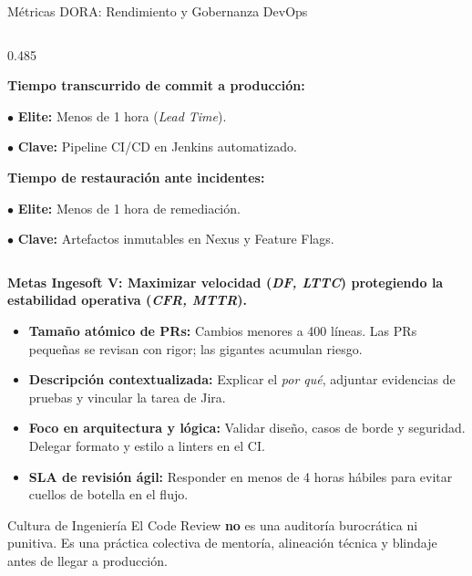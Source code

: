 \documentclass[aspectratio=169]{beamer}
\begin{document}
\begin{frame}{Métricas DORA: Rendimiento y Gobernanza DevOps}
\begin{columns}[T,onlytextwidth]
    \begin{column}{0.485\textwidth}
      \begin{tcolorbox}[colback=cbPurple!8,colframe=cbPurple,arc=3pt,title=\textbf{2. Tiempo de Entrega (LTTC)},coltitle=cbWhite,fonttitle=\bfseries\scriptsize,top=2.5pt,bottom=2.5pt,left=5pt,right=5pt]
        {\tiny
        \textbf{Tiempo transcurrido de commit a producción:}\par\vspace{1pt}
        $\bullet$ \textbf{Elite:} Menos de 1 hora (\textit{Lead Time}).\par
        $\bullet$ \textbf{Clave:} Pipeline CI/CD en Jenkins automatizado.
        }
      \end{tcolorbox}
      \vspace{0.15cm}
      \begin{tcolorbox}[colback=cbGreen!8,colframe=cbGreen,arc=3pt,title=\textbf{4. Tiempo de Recuperación (MTTR)},coltitle=cbWhite,fonttitle=\bfseries\scriptsize,top=2.5pt,bottom=2.5pt,left=5pt,right=5pt]
        {\tiny
        \textbf{Tiempo de restauración ante incidentes:}\par\vspace{1pt}
        $\bullet$ \textbf{Elite:} Menos de 1 hora de remediación.\par
        $\bullet$ \textbf{Clave:} Artefactos inmutables en Nexus y Feature Flags.
        }
      \end{tcolorbox}
    \end{column}
  \end{columns}

  \vspace{0.25cm}
  \centering
  {\scriptsize\bfseries\color{cbBlue} Metas Ingesoft V: Maximizar velocidad (\textit{DF, LTTC}) protegiendo la estabilidad operativa (\textit{CFR, MTTR}).}
\end{frame}

  {
    {\footnotesize
    \begin{itemize}
      \setlength{\itemsep}{1.5pt}
      \item \textbf{Tamaño atómico de PRs:} Cambios menores a 400 líneas. Las PRs pequeñas se revisan con rigor; las gigantes acumulan riesgo.
      \item \textbf{Descripción contextualizada:} Explicar el \textit{por qué}, adjuntar evidencias de pruebas y vincular la tarea de Jira.
      \item \textbf{Foco en arquitectura y lógica:} Validar diseño, casos de borde y seguridad. Delegar formato y estilo a linters en el CI.
      \item \textbf{SLA de revisión ágil:} Responder en menos de 4 horas hábiles para evitar cuellos de botella en el flujo.
    \end{itemize}
    }
  }
  {Cultura de Ingeniería}
  {
    El Code Review \textbf{no} es una auditoría burocrática ni punitiva. Es una práctica colectiva de mentoría, alineación técnica y blindaje antes de llegar a producción.
  }
\end{document}
